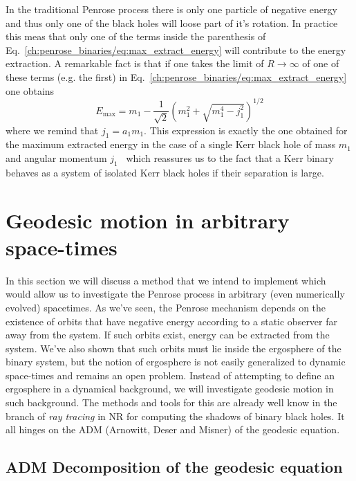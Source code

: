 In the traditional Penrose process there is only one particle of negative energy and thus only one of the black holes will loose part of it's rotation. In practice this meas that only one of the terms inside the parenthesis of Eq.~\ref{ch:penrose_binaries/eq:max_extract_energy} will contribute to the energy extraction. A remarkable fact is that if one takes the limit of $R \rightarrow \infty$ of one of these terms (e.g. the first) in Eq.~\ref{ch:penrose_binaries/eq:max_extract_energy} one obtains
%
\begin{equation}
  E_{\text{max}} = m_1 - \frac{1}{\sqrt{2}}\left(m_1^2 + \sqrt{m_1^4 - j_1^2}\right)^{1/2}
  \label{ch:penrose_binaries/eq:energy_extraction_kerr_limit}
\end{equation}
%
where we remind that $j_1=a_1m_1$. This expression is exactly the one obtained for the maximum extracted energy in the case of a single Kerr black hole of mass $m_1$ and angular momentum $j_1$~\cite{carroll} which reassures us to the fact that a Kerr binary behaves as a system of isolated Kerr black holes if their separation is large.

\section{Geodesic motion in arbitrary space-times}

In this section we will discuss a method that we intend to implement which would allow us to investigate the Penrose process in arbitrary (even numerically evolved) spacetimes. As we've seen, the Penrose mechanism depends on the existence of orbits that have negative energy according to a static observer far away from the system. If such orbits exist, energy can be extracted from the system. We've also shown that such orbits must lie inside the ergosphere of the binary system, but the notion of ergosphere is not easily generalized to dynamic space-times and remains an open problem. Instead of attempting to define an ergosphere in a dynamical background, we will investigate geodesic motion in such background. The methods and tools for this are already well know in the branch of \emph{ray tracing} in NR for computing the shadows of binary black holes. It all hinges on the ADM (Arnowitt, Deser and Misner) of the geodesic equation.

\subsection{ADM Decomposition of the geodesic equation}

